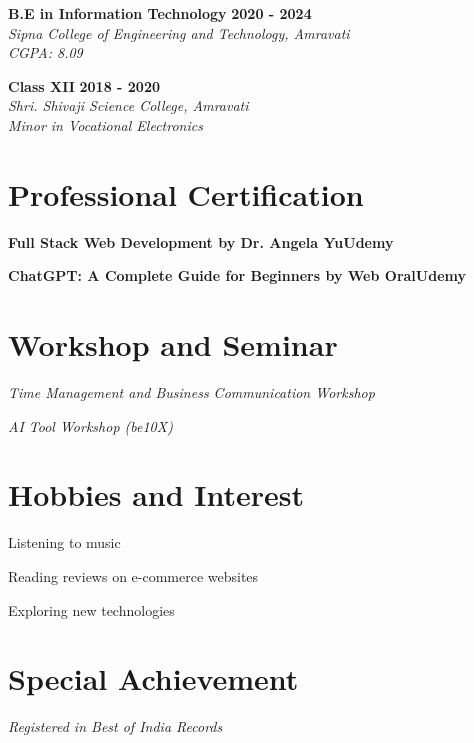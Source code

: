 \documentclass[letterpaper,10pt]{article}
\newcommand{\heading}[2]{
  \hspace{10pt}#1\hfill#2\\
}
\newcommand{\headingBf}[2]{
  \heading{\textbf{#1}}{\textbf{#2}}
}
\newcommand{\headingIt}[2]{
  \heading{\textit{#1}}{\textit{#2}}
}
\newenvironment{resume_list}{
  \vspace{-7pt}
  \begin{itemize}[itemsep=-2px, parsep=1pt, leftmargin=30pt]
}{
  \end{itemize}
}
\begin{document}
  \headingBf{B.E in Information Technology }{2020 - 2024} %
  \headingIt{Sipna College of Engineering and Technology, Amravati }{}
  \headingIt{CGPA: 8.09 }{}

\vspace{5pt}

  \headingBf{Class XII  }{2018 - 2020} %
  \headingIt{Shri. Shivaji Science College,  Amravati }{}
  \headingIt{Minor in Vocational Electronics  }{}
  


  \section{Professional Certification}

  \headingBf{Full Stack Web Development by Dr. Angela Yu}{Udemy}

\vspace{5pt}

  \headingBf{ChatGPT: A Complete Guide for Beginners by Web Oral}{Udemy}

    \section{Workshop and Seminar}
    \headingIt{Time Management and Business Communication Workshop }{}
    
    \vspace{5pt}
    
   \headingIt{AI Tool Workshop (be10X)  }{}


        \section{Hobbies and Interest}
        \begin{resume_list}
\item{Listening to music }
\item{Reading reviews on e-commerce websites }
\item{Exploring new technologies }
        \end{resume_list}

    \section{Special Achievement}
    \headingIt{Registered in Best of India Records }{}
   
    
\end{document}
